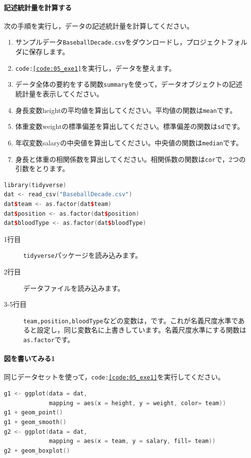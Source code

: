 \documentclass{ltjsbook}
\begin{document}
\paragraph{記述統計量を計算する}次の手順を実行し，データの記述統計量を計算してください。

\begin{enumerate}
	\item サンプルデータ\texttt{BaseballDecade.csv}をダウンロードし，プロジェクトフォルダに保存します。
	\item \texttt{code:\ref{code:05_exe1}}を実行し，データを整えます。
	\item データ全体の要約をする関数\verb|summary|を使って，データオブジェクトの記述統計量を表示してください。
	\item 身長変数heightの平均値を算出してください。平均値の関数は\verb|mean|です。
	\item 体重変数weightの標準偏差を算出してください。標準偏差の関数は\verb|sd|です。
	\item 年収変数salaryの中央値を算出してください。中央値の関数は\verb|median|です。
	\item 身長と体重の相関係数を算出してください。相関係数の関数は\verb|cor|で，2つの引数をとります。
\end{enumerate}

\begin{lstlisting}[language=c++,label={code:05_exe1},caption={データの読み込みと整え}]
library(tidyverse)
dat <- read_csv("BaseballDecade.csv")
dat$team <- as.factor(dat$team)
dat$position <- as.factor(dat$position)
dat$bloodType <- as.factor(dat$bloodType)
\end{lstlisting}

\begin{description}
	\item[1行目] \texttt{tidyverse}パッケージを読み込みます。
	\item[2行目] データファイルを読み込みます。
	\item[3-5行目] \texttt{team,position,bloodType}などの変数は，です。これが名義尺度水準であると設定し，同じ変数名に上書きしています。名義尺度水準にする関数は\texttt{as.factor}です。
\end{description}

\paragraph{図を書いてみる1}同じデータセットを使って，\texttt{code:\ref{code:05_exe1}}を実行してください。
\begin{lstlisting}[language=c++,label={code:05_exe2},caption={さまざまなグラフを書いてみる}]
g1 <- ggplot(data = dat, 
             mapping = aes(x = height, y = weight, color= team))
g1 + geom_point()
g1 + geom_smooth() 
g2 <- ggplot(data = dat, 
             mapping = aes(x = team, y = salary, fill= team))
g2 + geom_boxplot()
\end{lstlisting}
\end{document}
